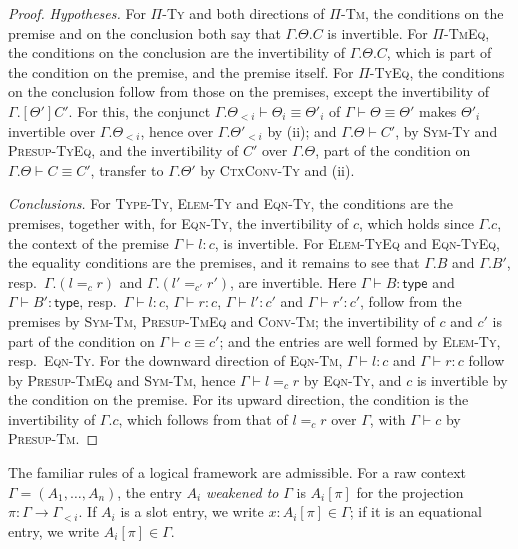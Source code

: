 \begin{proof}
    \emph{Hypotheses.} For \textsc{$\Pi$-Ty} and both directions of \textsc{$\Pi$-Tm}, the conditions on the premise and on the conclusion both say that $\Gamma.\Theta.C$ is invertible. For \textsc{$\Pi$-TmEq}, the conditions on the conclusion are the invertibility of $\Gamma.\Theta.C$, which is part of the condition on the premise, and the premise itself. For \textsc{$\Pi$-TyEq}, the conditions on the conclusion follow from those on the premises, except the invertibility of $\Gamma.[\Theta']C'$. For this, the conjunct $\Gamma.\Theta_{<i} \vdash \Theta_i \equiv \Theta'_i$ of $\Gamma \vdash \Theta \equiv \Theta'$ makes $\Theta'_i$ invertible over $\Gamma.\Theta_{<i}$, hence over $\Gamma.\Theta'_{<i}$ by (ii); and $\Gamma.\Theta \vdash C'$, by \textsc{Sym-Ty} and \textsc{Presup-TyEq}, and the invertibility of $C'$ over $\Gamma.\Theta$, part of the condition on $\Gamma.\Theta \vdash C \equiv C'$, transfer to $\Gamma.\Theta'$ by \textsc{CtxConv-Ty} and (ii).

    \emph{Conclusions.} For \textsc{Type-Ty}, \textsc{Elem-Ty} and \textsc{Eqn-Ty}, the conditions are the premises, together with, for \textsc{Eqn-Ty}, the invertibility of $c$, which holds since $\Gamma.c$, the context of the premise $\Gamma \vdash l : c$, is invertible. For \textsc{Elem-TyEq} and \textsc{Eqn-TyEq}, the equality conditions are the premises, and it remains to see that $\Gamma.B$ and $\Gamma.B'$, resp.\ $\Gamma.(l =_c r)$ and $\Gamma.(l' =_{c'} r')$, are invertible. Here $\Gamma \vdash B : \mathsf{type}$ and $\Gamma \vdash B' : \mathsf{type}$, resp.\ $\Gamma \vdash l : c$, $\Gamma \vdash r : c$, $\Gamma \vdash l' : c'$ and $\Gamma \vdash r' : c'$, follow from the premises by \textsc{Sym-Tm}, \textsc{Presup-TmEq} and \textsc{Conv-Tm}; the invertibility of $c$ and $c'$ is part of the condition on $\Gamma \vdash c \equiv c'$; and the entries are well formed by \textsc{Elem-Ty}, resp.\ \textsc{Eqn-Ty}. For the downward direction of \textsc{Eqn-Tm}, $\Gamma \vdash l : c$ and $\Gamma \vdash r : c$ follow by \textsc{Presup-TmEq} and \textsc{Sym-Tm}, hence $\Gamma \vdash l =_c r$ by \textsc{Eqn-Ty}, and $c$ is invertible by the condition on the premise. For its upward direction, the condition is the invertibility of $\Gamma.c$, which follows from that of $l =_c r$ over $\Gamma$, with $\Gamma \vdash c$ by \textsc{Presup-Tm}.
\end{proof}

The familiar rules of a logical framework are admissible. For a raw context $\Gamma = (A_1, \ldots, A_n)$, the entry $A_i$ \emph{weakened to} $\Gamma$ is $A_i[\pi]$ for the projection $\pi : \Gamma \to \Gamma_{<i}$. If $A_i$ is a slot entry, we write $x : A_i[\pi] \in \Gamma$; if it is an equational entry, we write $A_i[\pi] \in \Gamma$.

